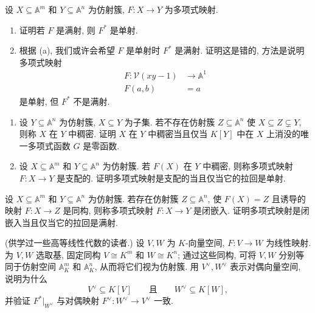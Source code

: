 \begin{BookExercises}
  \item\label{ex:pullback-injectivity-and-surjectivity} 设 $X\subseteq\mathbb{A}^{m}$ 和 $Y\subseteq\mathbb{A}^{n}$ 为仿射簇, $F:X\to Y$ 为多项式映射.
    \begin{enumerate}[label=(\alph*)]
      \item 证明若 $F$ 是满射, 则 $F^{*}$ 是单射.
      \item 根据 (a), 我们或许会希望 $F$ 是单射时 $F^{*}$ 是满射. 证明这是错的, 方法是说明多项式映射
        \[
          \begin{aligned}
            F:\mathcal{V}(xy-1)&\to\mathbb{A}^{1}\\
            F(a,b)&=a
          \end{aligned}
        \]
        是单射, 但 $F^{*}$ 不是满射.
    \end{enumerate}
  \item\label{ex:density-dominance-and-injective-pullback}
    \begin{enumerate}[label=(\alph*)]
      \item 设 $Y\subseteq\mathbb{A}^{n}$ 为仿射簇, $X\subseteq Y$ 为子集. 若不存在仿射簇 $Z\subseteq\mathbb{A}^{n}$ 使 $X\subseteq Z\subsetneq Y$, 则称 $X$ 在 $Y$ 中稠密. 证明 $X$ 在 $Y$ 中稠密当且仅当 $K[Y]$ 中在 $X$ 上消没的唯一多项式函数 $G$ 是零函数.
      \item 设 $X\subseteq\mathbb{A}^{m}$ 和 $Y\subseteq\mathbb{A}^{n}$ 为仿射簇. 若 $F(X)$ 在 $Y$ 中稠密, 则称多项式映射 $F:X\to Y$ 是支配的. 证明多项式映射是支配的当且仅当它的拉回是单射.
    \end{enumerate}
  \item\label{ex:closed-embedding-surjective-pullback} 设 $X\subseteq\mathbb{A}^{m}$ 和 $Y\subseteq\mathbb{A}^{n}$ 为仿射簇. 若存在仿射簇 $Z\subseteq\mathbb{A}^{n}$, 使 $F(X)=Z$ 且诱导的映射 $F:X\to Z$ 是同构, 则称多项式映射 $F:X\to Y$ 是闭嵌入. 证明多项式映射是闭嵌入当且仅当它的拉回是满射.
  \item\label{ex:pullback-restricts-to-dual-map} (供学过一些高等线性代数的读者.) 设 $V,W$ 为 $K$-向量空间, $F:V\to W$ 为线性映射. 为 $V,W$ 选取基, 固定同构 $V\cong K^{m}$ 和 $W\cong K^{n}$; 通过这些同构, 可将 $V,W$ 分别等同于仿射空间 $\mathbb{A}^{m}_{K}$ 和 $\mathbb{A}^{n}_{K}$, 从而将它们视为仿射簇. 用 $V^{\vee},W^{\vee}$ 表示对偶向量空间, 说明为什么
    \[
      V^{\vee}\subseteq K[V]\qquad\text{且}\qquad W^{\vee}\subseteq K[W],
    \]
    并验证 $F^{*}|_{W^{\vee}}$ 与对偶映射 $F^{\vee}:W^{\vee}\to V^{\vee}$ 一致.
\end{BookExercises}
